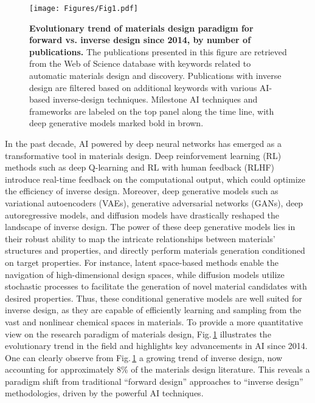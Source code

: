 \documentclass[fleqn,10pt]{wlscirep}
\begin{document}
\begin{figure}[!htbp]
    \centering
    \texttt{[image: Figures/Fig1.pdf]}
    \caption{\textbf{Evolutionary trend of materials design paradigm for forward vs. inverse design since 2014, by number of publications.} The publications presented in this figure are retrieved from the Web of Science database with keywords related to automatic materials design and discovery. 
    Publications with inverse design are filtered based on additional keywords with various AI-based inverse-design techniques. %
    Milestone AI techniques and frameworks are labeled on the top panel along the time line, with deep generative models marked bold in brown.}
    \label{fig1}
\end{figure}

In the past decade, AI powered by deep neural networks has emerged as a transformative tool in materials design. 
Deep reinforvement learning (RL) methods such as deep Q-learning  \cite{mnih2013playing} and RL with human feedback (RLHF) \cite{christiano2017deep} introduce real-time feedback on the computational output, which could optimize the efficiency of inverse design.
Moreover, deep generative models such as variational autoencoders (VAEs)\cite{kingma2013auto}, generative adversarial networks (GANs)\cite{goodfellow2014generative}, deep autoregressive models\cite{van2016pixel}, and diffusion models\cite{ho2020denoising} have drastically reshaped the landscape of inverse design.
The power of these deep generative models lies in their robust ability to map the intricate relationships between materials' structures and properties, and directly perform materials generation conditioned on target properties. 
For instance, latent space-based methods enable the navigation of high-dimensional design spaces, while diffusion models utilize stochastic processes to facilitate the generation of novel material candidates with desired properties. 
Thus, these conditional generative models are well suited for inverse design, as they are capable of efficiently learning and sampling from the vast and nonlinear chemical spaces in materials.
To provide a more quantitative view on the research paradigm of materials design, Fig.\,\ref{fig1} illustrates the evolutionary trend in the field and highlights key advancements in AI since 2014. 
One can clearly observe from Fig.\,\ref{fig1} a growing trend of inverse design, now accounting for approximately 8\% of the materials design literature.
This reveals a paradigm shift from traditional ``forward design'' approaches to ``inverse design'' methodologies, driven by the powerful AI techniques. 
\end{document}
